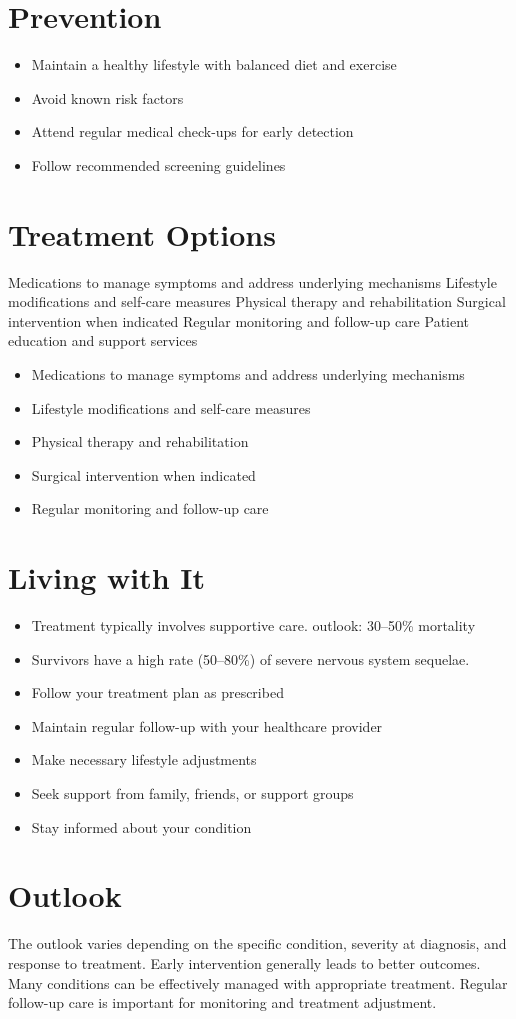 \section{Prevention}
\begin{itemize}[noitemsep]
  \item Maintain a healthy lifestyle with balanced diet and exercise
  \item Avoid known risk factors
  \item Attend regular medical check-ups for early detection
  \item Follow recommended screening guidelines
\end{itemize}
\section{Treatment Options}
Medications to manage symptoms and address underlying mechanisms Lifestyle modifications and self-care measures Physical therapy and rehabilitation Surgical intervention when indicated Regular monitoring and follow-up care Patient education and support services

\begin{itemize}[noitemsep]
  \item Medications to manage symptoms and address underlying mechanisms
  \item Lifestyle modifications and self-care measures
  \item Physical therapy and rehabilitation
  \item Surgical intervention when indicated
  \item Regular monitoring and follow-up care
\end{itemize}
\section{Living with It}
\begin{itemize}[noitemsep]
  \item Treatment typically involves supportive care. outlook: 30--50\% mortality
  \item Survivors have a high rate (50--80\%) of severe nervous system sequelae.
  \item Follow your treatment plan as prescribed
  \item Maintain regular follow-up with your healthcare provider
  \item Make necessary lifestyle adjustments
  \item Seek support from family, friends, or support groups
  \item Stay informed about your condition
\end{itemize}
\section{Outlook}
The outlook varies depending on the specific condition, severity at diagnosis, and response to treatment. Early intervention generally leads to better outcomes. Many conditions can be effectively managed with appropriate treatment. Regular follow-up care is important for monitoring and treatment adjustment.
